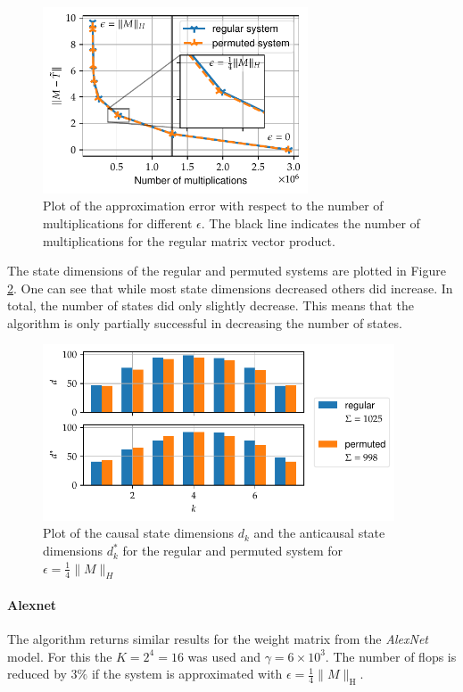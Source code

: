 \documentclass[numbers=noenddot,doctype=mastersthesis,BCOR=15mm,biblatex]{ldvbook}%
\begin{document}
\begin{figure}[!htb]
	\centering
	\includegraphics[width=0.7\textwidth]{Plots/perm_example_mobilenet_error.pdf}
	\caption{Plot of the approximation error with respect to the number of multiplications for different $\epsilon$. 
		The black line indicates the number of multiplications for the regular matrix vector product. 
	}
	\label{fig:mobilenet_err_cost_perm}
\end{figure}

The state dimensions of the regular and permuted systems are plotted in Figure\,\ref{fig:mobilenet_state_dims_perm}.
One can see that while most state dimensions decreased others did increase.
In total, the number of states did only slightly decrease.
This means that the algorithm is only partially successful in decreasing the number of states.
\begin{figure}[!htb]
	\centering
	\includegraphics[width=0.93\textwidth]{Plots/perm_example_mobilenet_state_dims.pdf}
	\caption{Plot of the causal state dimensions $d_k$ and the anticausal state dimensions $d_k^*$ for the regular and permuted system for $\epsilon = \frac{1}{4} \|M\|_H$
	}
	\label{fig:mobilenet_state_dims_perm}
\end{figure}

\paragraph{Alexnet}
The algorithm returns similar results for the weight matrix from the \emph{AlexNet} model.
For this the $K = 2^4 = 16$ was used and $\gamma =  6\times10^3$.
The number of flops is reduced by $3\%$ if the system is approximated with $\epsilon = \frac{1}{4}\|M\|_\text{H}$.
\end{document}
